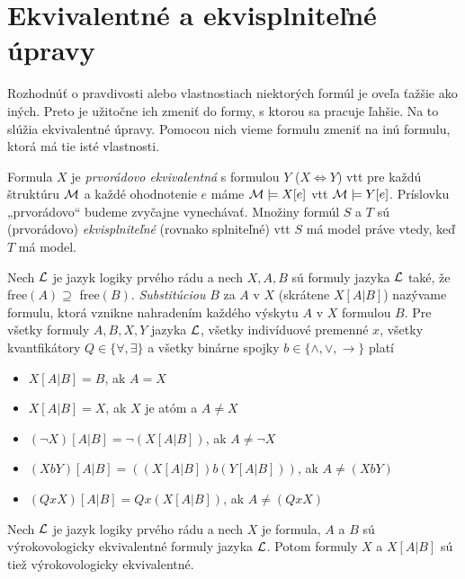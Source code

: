 
\section{Ekvivalentné a ekvisplniteľné úpravy}

Rozhodnúť o pravdivosti alebo vlastnostiach niektorých formúl je oveľa ťažšie ako iných. Preto je užitočne ich zmeniť do formy, s ktorou sa pracuje ľahšie. Na to slúžia ekvivalentné úpravy. Pomocou nich vieme formulu zmeniť na inú formulu, ktorá má tie isté vlastnosti.

Formula $X$ je \emph{prvorádovo ekvivalentná} s formulou $Y$ ($X \Leftrightarrow Y$) vtt pre každú štruktúru $\mathcal{M}$ a každé ohodnotenie $e$ máme $\mathcal{M} \models X[e]$ vtt $\mathcal{M} \models Y [e]$. Príslovku „prvorádovo“ budeme zvyčajne vynechávať.
Množiny formúl $S$ a $T$ sú (prvorádovo) \emph{ekvisplniteľné} (rovnako splniteľné) vtt $S$ má model práve vtedy, keď $T$ má model.

Nech $\mathcal{L}$ je jazyk logiky prvého rádu a nech $X, A, B$ sú formuly jazyka $\mathcal{L}$ také, že free$(A) \supseteq$ free$(B)$. \emph{Substitúciou} $B$ za $A$ v $X$ (skrátene $X[A|B]$) nazývame formulu, ktorá vznikne nahradením každého výskytu $A$ v $X$ formulou $B$.
Pre všetky formuly $A, B, X, Y$ jazyka $\mathcal{L}$, všetky indivíduové premenné $x$, všetky kvantfikátory $Q \in \{\forall, \exists\}$ a všetky binárne spojky $b \in \{\land, \lor, \to\}$ platí
\begin{itemize}
\item $X[A|B] = B$, ak $A = X$
\item $X[A|B] = X$, ak $X$ je atóm a $A \ne X$
\item $(\neg X)[A|B] = \neg(X[A|B])$, ak $A \ne \neg X$
\item $(X b Y)[A|B] = ((X[A|B]) b (Y[A|B]))$, ak $A \ne (X b Y)$
\item $(Qx X)[A|B] = Qx (X[A|B])$, ak $A \ne (Qx X)$
\end{itemize}
Nech $\mathcal{L}$ je jazyk logiky prvého rádu a nech $X$ je formula, $A$ a $B$ sú výrokovologicky ekvivalentné formuly jazyka $\mathcal{L}$. Potom formuly $X$ a $X[A|B]$ sú tiež výrokovologicky ekvivalentné.

